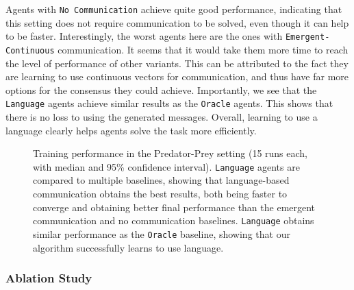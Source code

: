 Agents with \texttt{No Communication} achieve quite good performance, indicating that this setting does not require communication to be solved, even though it can help to be faster. Interestingly, the worst agents here are the ones with \texttt{Emergent-}\texttt{Continuous} communication. It seems that it would take them more time to reach the level of performance of other variants. This can be attributed to the fact they are learning to use continuous vectors for communication, and thus have far more options for the consensus they could achieve. Importantly, we see that the \texttt{Language} agents achieve similar results as the \texttt{Oracle} agents. This shows that there is no loss to using the generated messages. Overall, learning to use a language clearly helps agents solve the task more efficiently.

\begin{figure}
    \centering
    
    \caption{Training performance in the Predator-Prey setting (15 runs each, with median and 95\% confidence interval). \texttt{Language} agents are compared to multiple baselines, showing that language-based communication obtains the best results, both being faster to converge and obtaining better final performance than the emergent communication and no communication baselines. \texttt{Language} obtains similar performance as the \texttt{Oracle} baseline, showing that our algorithm successfully learns to use language.}
    \label{fig:LAMAC:trainSA9}
\end{figure}



\subsubsection{Ablation Study}\label{sec:LAMAC:Exp_Ablations}

